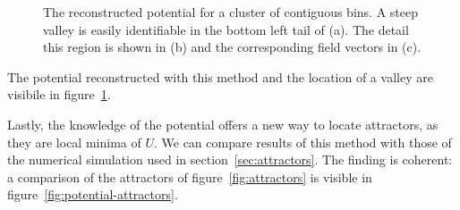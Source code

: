 \documentclass[a4paper]{article}
\begin{document}
\begin{figure}
\begin{minipage}[t]{0.27\linewidth}
  \end{minipage}
  \caption{The reconstructed potential for a cluster of contiguous bins. A steep valley is easily identifiable in the bottom left tail of (a). The detail this region is shown in (b) and the corresponding field vectors in (c).}
  \label{fig:potential}
\end{figure}
The potential reconstructed with this method and the location of a valley are visibile in figure~\ref{fig:potential}.

Lastly, the knowledge of the potential offers a new way to locate attractors, as they are local minima of $U$. We can compare results of this method with those of the numerical simulation used in section~\ref{sec:attractors}. The finding is coherent: a comparison of the attractors of figure~\ref{fig:attractors} is visible in figure~\ref{fig:potential-attractors}.

\clearpage
\end{document}
